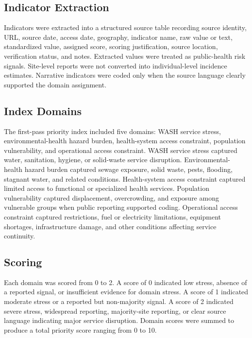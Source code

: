\subsection{Indicator Extraction}

Indicators were extracted into a structured source table recording source identity, URL, source date, access date, geography, indicator name, raw value or text, standardized value, assigned score, scoring justification, source location, verification status, and notes. Extracted values were treated as public-health risk signals. Site-level reports were not converted into individual-level incidence estimates. Narrative indicators were coded only when the source language clearly supported the domain assignment.

\subsection{Index Domains}

The first-pass priority index included five domains: WASH service stress, environmental-health hazard burden, health-system access constraint, population vulnerability, and operational access constraint. WASH service stress captured water, sanitation, hygiene, or solid-waste service disruption. Environmental-health hazard burden captured sewage exposure, solid waste, pests, flooding, stagnant water, and related conditions. Health-system access constraint captured limited access to functional or specialized health services. Population vulnerability captured displacement, overcrowding, and exposure among vulnerable groups when public reporting supported coding. Operational access constraint captured restrictions, fuel or electricity limitations, equipment shortages, infrastructure damage, and other conditions affecting service continuity.

\subsection{Scoring}

Each domain was scored from 0 to 2. A score of 0 indicated low stress, absence of a reported signal, or insufficient evidence for domain stress. A score of 1 indicated moderate stress or a reported but non-majority signal. A score of 2 indicated severe stress, widespread reporting, majority-site reporting, or clear source language indicating major service disruption. Domain scores were summed to produce a total priority score ranging from 0 to 10.

